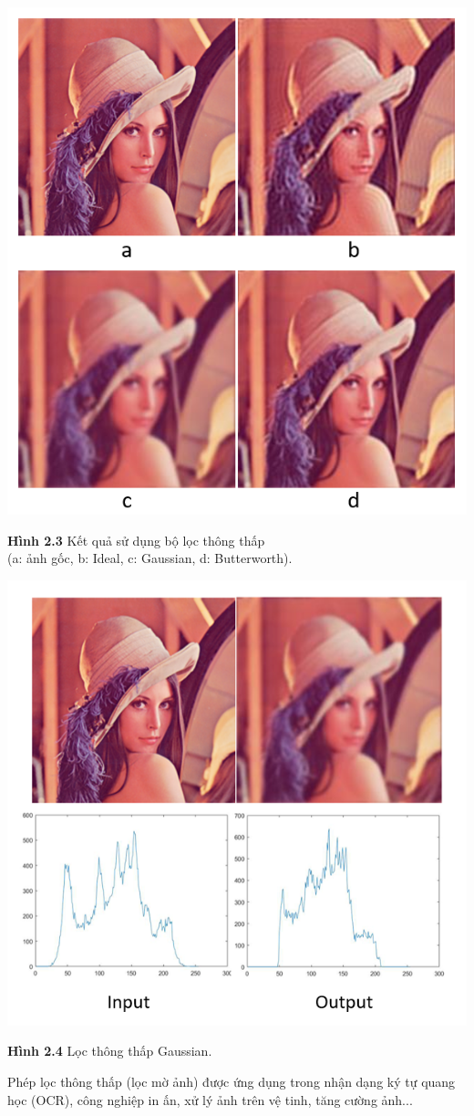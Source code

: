 \begin{center}
    \includegraphics[scale=0.7]{Figures/fig8.png}
    \par \textbf {Hình 2.3} Kết quả sử dụng bộ lọc thông thấp\\ (a: ảnh gốc, b: Ideal, c: Gaussian, d: Butterworth).
\end{center}
\begin{center}
    \includegraphics[scale=0.9]{Figures/fig7a.png}
    \par \textbf {Hình 2.4} Lọc thông thấp Gaussian.
\end{center}
\par Phép lọc thông thấp (lọc mờ ảnh) được ứng dụng trong nhận dạng ký tự quang học (OCR), công nghiệp in ấn, xử lý ảnh trên vệ tinh, tăng cường ảnh...

